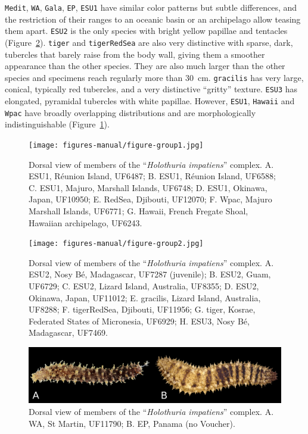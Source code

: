 \documentclass[12pt,letterpaper]{article}\usepackage[]{graphicx}\usepackage[]{color}
\begin{document}
\texttt{Medit}, \texttt{WA}, \texttt{Gala}, \texttt{EP}, \texttt{ESU1} have
similar color patterns but subtle differences, and the restriction of their
ranges to an oceanic basin or an archipelago allow teasing them
apart. \texttt{ESU2} is the only species with bright yellow papillae and
tentacles (Figure~\ref{fig:photo-ESU2-andFriends}). \texttt{tiger} and
\texttt{tigerRedSea} are also very distinctive with sparse, dark, tubercles that
barely raise from the body wall, giving them a smoother appearance than the
other species. They are also much larger than the other species and specimens
reach regularly more than 30~cm. \texttt{gracilis} has very large, conical,
typically red tubercles, and a very distinctive ``gritty'' texture.
\texttt{ESU3} has elongated, pyramidal tubercles with white papillae. However,
\texttt{ESU1}, \texttt{Hawaii} and \texttt{Wpac} have broadly overlapping
distributions and are morphologically indistinguishable
(Figure~\ref{fig:photo-ESU1-andFriends}).

\begin{figure}
  \centering
    \texttt{[image: figures-manual/figure-group1.jpg]}
    \caption{Dorsal view of members of the ``\textit{Holothuria impatiens}''
      complex. A. ESU1, R\'{e}union Island, UF6487; B. ESU1, R\'{e}union Island,
      UF6588; C. ESU1, Majuro, Marshall Islands, UF6748; D. ESU1, Okinawa, Japan, UF10950;
      E. RedSea, Djibouti, UF12070; F. Wpac, Majuro Marshall Islands, UF6771;
      G. Hawaii, French Fregate Shoal, Hawaiian archipelago, UF6243.}
    \label{fig:photo-ESU1-andFriends}
\end{figure}

\begin{figure}
  \centering
    \texttt{[image: figures-manual/figure-group2.jpg]}
    \caption{Dorsal view of members of the ``\textit{Holothuria impatiens}''
      complex. A. ESU2, Nosy B\'{e}, Madagascar, UF7287 (juvenile); B. ESU2,
      Guam, UF6729; C. ESU2, Lizard Island, Australia, UF8355; D. ESU2, Okinawa,
      Japan, UF11012; E. gracilis, Lizard Island, Australia, UF8288;
      F. tigerRedSea, Djibouti, UF11956; G. tiger, Kosrae, Federated States of
      Micronesia, UF6929; H. ESU3, Nosy B\'{e}, Madagascar, UF7469.}
    \label{fig:photo-ESU2-andFriends}
\end{figure}


\begin{figure}
  \centering
    \includegraphics[width=6.5in]{figures-manual/figure-group3.jpg}
    \caption{Dorsal view of members of the ``\textit{Holothuria impatiens}''
      complex. A. WA, St Martin, UF11790; B. EP, Panama (no Voucher).}
    \label{fig:photo-WA+EP}
\end{figure}
\end{document}
